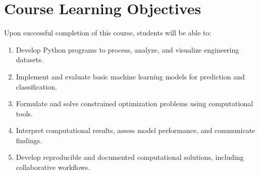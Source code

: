 \documentclass[11pt]{article}
\begin{document}

\section*{Course Learning Objectives}

Upon successful completion of this course, students will
be able to:

\begin{enumerate}[label=\arabic*.,nosep]
    \item Develop Python programs to process, analyze,
    and visualize engineering datasets.
    \item Implement and evaluate basic machine learning
    models for prediction and classification.
    \item Formulate and solve constrained optimization
    problems using computational tools.
    \item Interpret computational results, assess model
    performance, and communicate findings.
    \item Develop reproducible and documented computational
    solutions, including collaborative workflows.
\end{enumerate}
\end{document}
